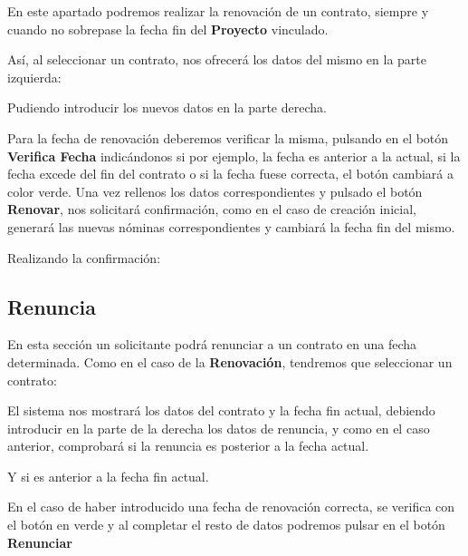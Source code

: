En este apartado podremos realizar la renovación de un contrato, siempre y cuando no sobrepase la fecha fin del \textbf{Proyecto}  vinculado.

Así, al seleccionar un contrato, nos ofrecerá los datos del mismo en la parte izquierda:


Pudiendo introducir los nuevos datos en la parte derecha.

Para la fecha de renovación deberemos verificar la misma, pulsando en el botón \textbf{Verifica Fecha} indicándonos si por ejemplo, la fecha es anterior a la actual, si la fecha excede del fin del contrato o si la fecha fuese correcta, el botón cambiará a color verde.
Una vez rellenos los datos correspondientes y pulsado el botón \textbf{Renovar}, nos solicitará confirmación, como en el caso de creación inicial, generará las nuevas nóminas correspondientes y cambiará la fecha fin del mismo.


Realizando la confirmación:


\subsection{Renuncia}\label{renuncia}

En esta sección un solicitante podrá renunciar a un contrato en una fecha determinada. Como en el caso de la \textbf{Renovación}, tendremos que  seleccionar un contrato:


El sistema nos mostrará los datos del contrato y la fecha fin actual, debiendo introducir en la parte de la derecha los datos de renuncia, y como en el caso anterior, comprobará si la renuncia es posterior a la fecha actual.


Y si es anterior a la fecha fin actual.


En el caso de haber introducido una fecha de renovación correcta, se verifica con el botón en verde y al completar el resto de datos podremos pulsar en el botón \textbf{Renunciar}

